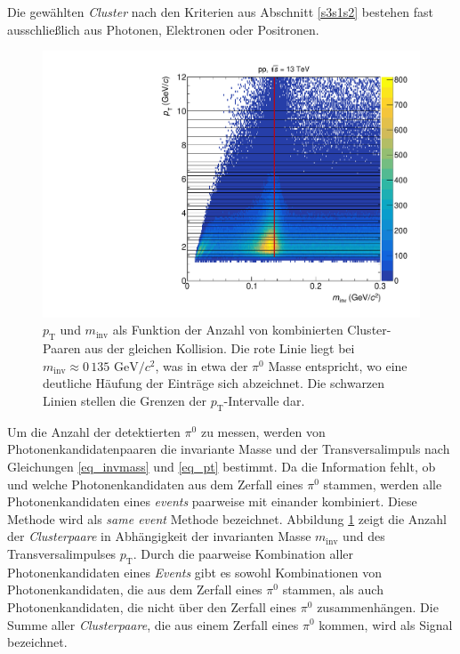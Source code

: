 Die gewählten \textit{Cluster} nach den Kriterien aus Abschnitt \ref{s3s1s2} bestehen fast ausschließlich aus Photonen, Elektronen oder Positronen.
\newline
\begin{figure}[tp]
\centering
\includegraphics[width=.7\linewidth]{hInvMass_pT_Signal.pdf}
\caption{$p_\text{T}$ und $m_\text{inv}$ als Funktion der Anzahl von kombinierten  Cluster-Paaren aus der gleichen Kollision.
Die rote Linie liegt bei $m_{\text{inv}}\approx0\,135\text{ GeV/}c^{2}$, was in etwa der $\pi^{0}$ Masse entspricht, wo eine deutliche Häufung der Einträge sich abzeichnet.
Die schwarzen Linien stellen die Grenzen der $p_{\text{T}}$-Intervalle dar.}
\label{figInvMassPt_a}
\end{figure}
Um die Anzahl der detektierten $\pi^{0}$ zu messen, werden von Photonenkandidatenpaaren die invariante Masse und der Transversalimpuls nach Gleichungen \ref{eq_invmass} und \ref{eq_pt} bestimmt.
Da die Information fehlt, ob und welche Photonenkandidaten aus dem Zerfall eines $\pi^{0}$ stammen, werden alle Photonenkandidaten eines \textit{events} paarweise mit einander kombiniert.
Diese Methode wird als \textit{same event} Methode bezeichnet.
Abbildung \ref{figInvMassPt_a} zeigt die Anzahl der \textit{Clusterpaare} in Abhängigkeit der invarianten Masse $m_{\text{inv}}$ und des Transversalimpulses $p_{\text{T}}$.
Durch die paarweise Kombination aller Photonenkandidaten eines \textit{Events} gibt es sowohl Kombinationen von Photonenkandidaten, die aus dem Zerfall eines $\pi^{0}$ stammen, als auch Photonenkandidaten, die nicht über den Zerfall eines $\pi^{0}$ zusammenhängen.
Die Summe aller \textit{Clusterpaare}, die aus einem Zerfall eines $\pi^{0}$ kommen, wird als Signal bezeichnet.
